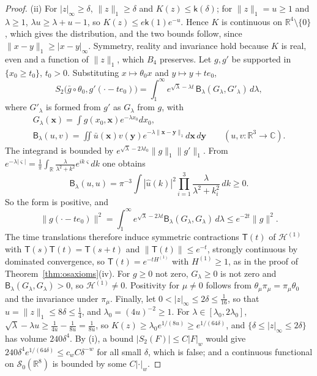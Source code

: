 \documentclass[aps,prd,twocolumn,superscriptaddress,nofootinbib,longbibliography,floatfix,amsmath,amssymb,10pt]{revtex4-2}
\theoremstyle{definition}
\theoremstyle{remark}
\newcommand{\R}{\mathbb{R}}
\newcommand{\C}{\mathbb{C}}
\begin{document}
\begin{proof}
(ii) For $|z|_\infty\ge\delta$, $\|z\|_1\ge\delta$ and $K(z)\le\mathsf
k(\delta)$; for $\|z\|_1=u\ge1$ and $\lambda\ge1$, $\lambda u\ge\lambda+u-1$, so
$K(z)\le e\mathsf k(1)e^{-u}$. Hence $K$ is continuous on $\R^4\setminus\{0\}$,
which gives the distribution, and the two bounds follow, since $\|x-y\|_1\ge
|x-y|_\infty$. Symmetry, reality and invariance hold because $K$ is real, even
and a function of $\|z\|_1$, which $B_4$ preserves. Let $g,g'$ be supported
in $\{x_0\ge t_0\}$, $t_0>0$. Substituting $x\mapsto\theta_0x$ and $y\mapsto
y+te_0$,
\[
S_2\bigl(\bar g\circ\theta_0,g'(\cdot-te_0)\bigr)=\int_1^\infty e^{\sqrt\lambda
-\lambda t}\,\mathsf B_\lambda(G_\lambda,G'_\lambda)\,d\lambda ,
\]
where $G'_\lambda$ is formed from $g'$ as $G_\lambda$ from $g$, with
\begin{gather*}
G_\lambda(\mathbf x)=\int g(x_0,\mathbf x)e^{-\lambda x_0}dx_0,\\
\mathsf B_\lambda(u,v)=\iint\bar u(\mathbf x)v(\mathbf y)e^{-\lambda\|\mathbf
x-\mathbf y\|_1}d\mathbf x\,d\mathbf y\qquad(u,v\colon\R^3\to\C) .
\end{gather*}
The integrand is bounded by $e^{\sqrt\lambda-2\lambda t_0}\|g\|_1
\|g'\|_1$. From $e^{-\lambda|\varsigma|}=\frac1\pi\int_\R\frac{\lambda}
{\lambda^2+k^2}e^{ik\varsigma}dk$ one obtains
\[
\mathsf B_\lambda(u,u)=\pi^{-3}\int|\hat u(k)|^2\prod_{i=1}^3\frac\lambda
{\lambda^2+k_i^2}\,dk\ge0 .
\]
So the form is positive, and
\[
\|g(\cdot-te_0)\|^2=\int_1^\infty e^{\sqrt\lambda-2\lambda t}\mathsf
B_\lambda(G_\lambda,G_\lambda)\,d\lambda\le e^{-2t}\|g\|^2 .
\]
The time
translations therefore induce symmetric contractions $\mathsf T(t)$ of
$\mathcal H^{(1)}$ with $\mathsf T(s)\mathsf T(t)=\mathsf T(s+t)$ and $\|\mathsf
T(t)\|\le e^{-t}$, strongly continuous by dominated convergence, so $\mathsf
T(t)=e^{-tH^{(1)}}$ with $H^{(1)}\ge1$, as in the proof of
Theorem~\ref{thm:osaxioms}(iv). For $g\ge0$ not zero, $G_\lambda\ge0$ is not
zero and $\mathsf B_\lambda(G_\lambda,G_\lambda)>0$, so $\mathcal H^{(1)}\ne0$.
Positivity for $\mu\ne0$ follows from $\theta_\mu\pi_\mu=\pi_\mu\theta_0$ and
the invariance under $\pi_\mu$. Finally, let $0<|z|_\infty\le2\delta\le\frac1
{16}$, so that $u=\|z\|_1\le8\delta\le\frac14$, and $\lambda_0=(4u)^{-2}\ge1$.
For $\lambda\in[\lambda_0,2\lambda_0]$, $\sqrt\lambda-\lambda u\ge\frac1{4u}-
\frac1{8u}=\frac1{8u}$, so $K(z)\ge\lambda_0e^{1/(8u)}\ge e^{1/(64\delta)}$, and
$\{\delta\le|z|_\infty\le2\delta\}$ has volume $240\delta^4$. By (i), a bound
$|S_2(F)|\le C|F|_w$ would give $240\delta^4e^{1/(64\delta)}\le c_wC\delta^{-w}$
for all small $\delta$, which is false; and a continuous functional on
$\mathcal S_0(\R^8)$ is bounded by some $C|\cdot|_w$.
\end{proof}
\end{document}
